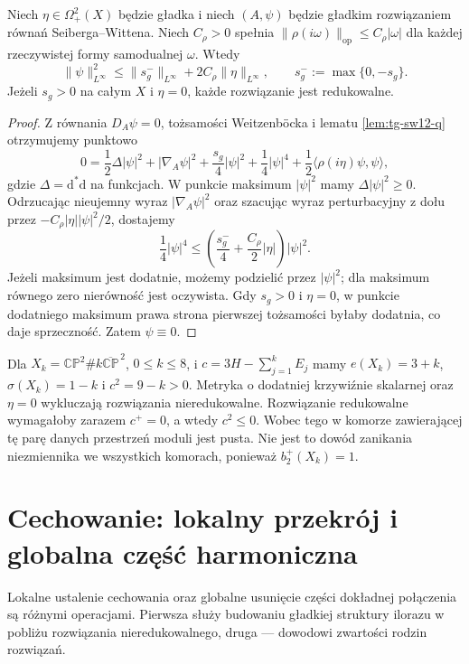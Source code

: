 \begin{twierdzenie}
\label{thm:tg-sw12-spinor-bound}
Niech $\eta\in\Omega^2_+(X)$ będzie gładka i niech $(A,\psi)$
będzie gładkim rozwiązaniem równań Seiberga--Wittena.
Niech $C_\rho>0$ spełnia
$\|\rho(i\omega)\|_{\mathrm{op}}\le C_\rho|\omega|$
dla każdej rzeczywistej formy samodualnej $\omega$.
Wtedy
\[
\|\psi\|_{L^\infty}^2\le
\|s_g^-\|_{L^\infty}+2C_\rho\|\eta\|_{L^\infty},
\qquad s_g^-:=\max\{0,-s_g\}.
\]
Jeżeli $s_g>0$ na całym $X$ i $\eta=0$, każde rozwiązanie
jest redukowalne.
\end{twierdzenie}

\begin{proof}
Z równania $D_A\psi=0$, tożsamości Weitzenböcka i
lematu \ref{lem:tg-sw12-q} otrzymujemy punktowo
\[
0=\frac12\Delta|\psi|^2+|\nabla_A\psi|^2
 +\frac{s_g}{4}|\psi|^2+\frac14|\psi|^4
 +\frac12\langle\rho(i\eta)\psi,\psi\rangle,
\]
gdzie $\Delta=\mathrm d^*\mathrm d$ na funkcjach.
W punkcie maksimum $|\psi|^2$ mamy $\Delta|\psi|^2\ge0$.
Odrzucając nieujemny wyraz $|\nabla_A\psi|^2$ oraz
szacując wyraz perturbacyjny z dołu przez
$-C_\rho|\eta||\psi|^2/2$, dostajemy
\[
\frac14|\psi|^4\le
\left(\frac{s_g^-}{4}+\frac{C_\rho}{2}|\eta|\right)
|\psi|^2.
\]
Jeżeli maksimum jest dodatnie, możemy podzielić przez
$|\psi|^2$; dla maksimum równego zero nierówność jest
oczywista. Gdy $s_g>0$ i $\eta=0$, w punkcie dodatniego
maksimum prawa strona pierwszej tożsamości byłaby dodatnia,
co daje sprzeczność. Zatem $\psi\equiv0$.
\end{proof}

\begin{przyklad}
Dla $X_k=\mathbb{CP}^2\#k\overline{\mathbb{CP}}^{\,2}$,
$0\le k\le8$, i $c=3H-\sum_{j=1}^kE_j$ mamy
$e(X_k)=3+k$, $\sigma(X_k)=1-k$ i $c^2=9-k>0$.
Metryka o dodatniej krzywiźnie skalarnej oraz $\eta=0$
wykluczają rozwiązania nieredukowalne. Rozwiązanie redukowalne
wymagałoby zarazem $c^+=0$, a wtedy $c^2\le0$.
Wobec tego w komorze zawierającej tę parę danych przestrzeń
moduli jest pusta. Nie jest to dowód zanikania niezmiennika
we wszystkich komorach, ponieważ $b_2^+(X_k)=1$.
\end{przyklad}

\section{Cechowanie: lokalny przekrój i globalna część harmoniczna}
\label{sec:tg-sw12-slice}

Lokalne ustalenie cechowania oraz globalne usunięcie części
dokładnej połączenia są różnymi operacjami. Pierwsza służy
budowaniu gładkiej struktury ilorazu w pobliżu rozwiązania
nieredukowalnego, druga --- dowodowi zwartości rodzin rozwiązań.

